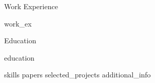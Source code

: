 \documentclass{resume} %
\begin{document}


\begin{rSection}{\faBriefcase \hspace{0.5mm} Work Experience}

    {work_ex}

\end{rSection}



\begin{rSection}{\faGraduationCap \hspace{0.5mm} Education}

    {education}
    
\end{rSection}


{skills}
{papers}
{selected_projects}
{additional_info}



        

\end{document}
